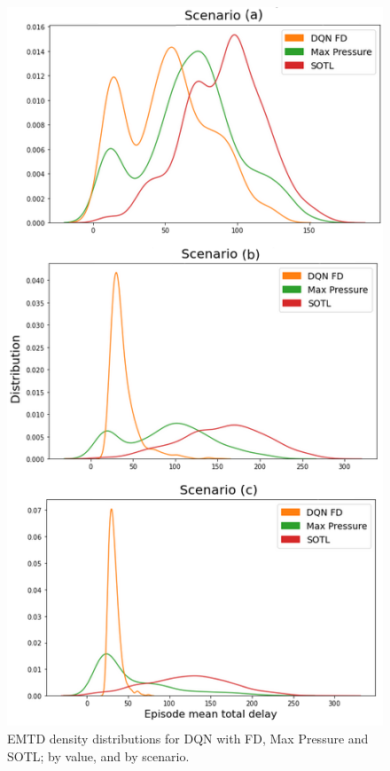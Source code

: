 \documentclass[journal]{IEEEtran}
\begin{document}
\begin{figure}[htbp]
  \begin{center}
    \includegraphics[width=0.9\linewidth,keepaspectratio]{img/results/fd_1.png}  
    \caption{EMTD density distributions for DQN with FD, Max Pressure and SOTL; by value, and by scenario.}
    \label{fig:fd_1}
  \end{center}
\end{figure}
\end{document}
